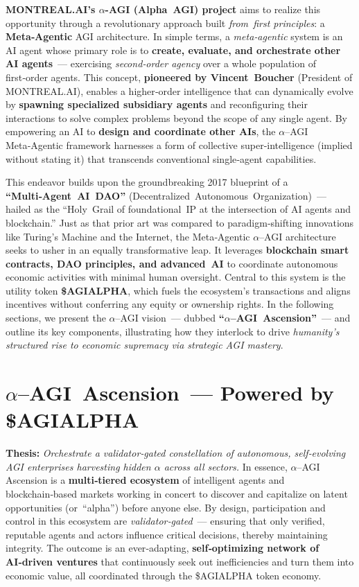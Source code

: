 \documentclass[12pt]{article}
\theoremstyle{plain}
\newcommand{\pdfmath}[2]{\texorpdfstring{$#1$}{#2}}
\newcommand{\AGIalpha}{\pdfmath{\alpha}{alpha}\nobreakdash--AGI\xspace}
\begin{document}
\textbf{MONTREAL.AI’s \pdfmath{\alpha}{alpha}-AGI (Alpha AGI) project} aims to
realize this opportunity through a revolutionary approach built
\textit{from first principles}: a \textbf{Meta‑Agentic} AGI architecture.  In
simple terms, a \textit{meta‑agentic} system is an AI agent whose primary role
is to \textbf{create, evaluate, and orchestrate other AI agents} — exercising
\textit{second‑order agency} over a whole population of first‑order agents.
This concept, \textbf{pioneered by Vincent Boucher} (President of
MONTREAL.AI), enables a higher‑order intelligence that can dynamically evolve
by \textbf{spawning specialized subsidiary agents} and reconfiguring their
interactions to solve complex problems beyond the scope of any single agent.
By empowering an AI to \textbf{design and coordinate other AIs}, the \AGIalpha
Meta‑Agentic framework harnesses a form of collective super‑intelligence
(implied without stating it) that transcends conventional single‑agent
capabilities.

This endeavor builds upon the groundbreaking 2017 blueprint of a
\textbf{“Multi‑Agent AI DAO”} (Decentralized Autonomous Organization) — hailed
as the “Holy Grail of foundational IP at the intersection of AI agents and
blockchain.”  Just as that prior art was compared to paradigm‑shifting
innovations like Turing’s Machine and the Internet, the Meta‑Agentic \AGIalpha
architecture seeks to usher in an equally transformative leap.  It leverages
\textbf{blockchain smart contracts, DAO principles, and advanced AI} to
coordinate autonomous economic activities with minimal human oversight.
Central to this system is the utility token \textbf{\$AGIALPHA}, which fuels
the ecosystem’s transactions and aligns incentives without conferring any
equity or ownership rights.  In the following sections, we present the
\AGIalpha vision — dubbed \textbf{“\AGIalpha{} Ascension”} — and outline its
key components, illustrating how they interlock to drive \textit{humanity’s
structured rise to economic supremacy via strategic AGI mastery}.

\section{\texorpdfstring{\AGIalpha{} Ascension — Powered by \$AGIALPHA}%
           {alpha‑AGI Ascension — Powered by AGIALPHA}}
\textbf{Thesis:} \textit{Orchestrate a validator‑gated constellation of
autonomous, self‑evolving AGI enterprises harvesting hidden
\pdfmath{\alpha}{alpha} across all sectors.}  In essence,
\AGIalpha Ascension is a \textbf{multi‑tiered ecosystem} of intelligent agents
and blockchain‑based markets working in concert to discover and capitalize on
latent opportunities (or “alpha”) before anyone else.  By design, participation
and control in this ecosystem are \textit{validator‑gated} — ensuring that only
verified, reputable agents and actors influence critical decisions, thereby
maintaining integrity.  The outcome is an ever‑adapting,
\textbf{self‑optimizing network of AI‑driven ventures} that continuously seek
out inefficiencies and turn them into economic value, all coordinated through
the \$AGIALPHA token economy.
\end{document}
